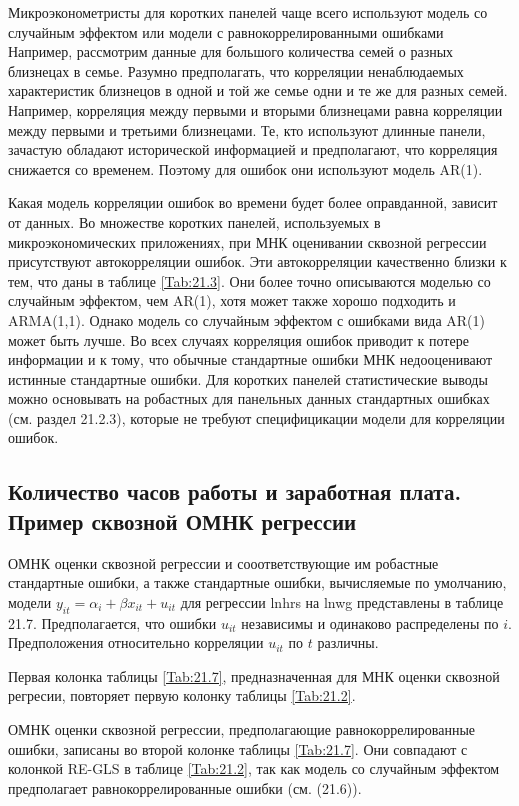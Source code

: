 Микроэконометристы для коротких панелей чаще всего используют модель со случайным эффектом или модели с равнокоррелированными ошибками Например, рассмотрим данные для большого количества семей о разных близнецах в семье. Разумно предполагать, что корреляции ненаблюдаемых характеристик близнецов в одной и той же семье одни и те же для разных семей. Например, корреляция между первыми и вторыми близнецами равна корреляции между первыми и третьими близнецами. Те, кто используют длинные панели, зачастую обладают исторической информацией и предполагают, что корреляция снижается со временем. Поэтому для ошибок они используют модель AR(1). 

Какая модель корреляции ошибок во времени будет более оправданной, зависит от данных. Во множестве коротких панелей, используемых в микроэкономических приложениях, при МНК оценивании сквозной регрессии присутствуют автокорреляции ошибок. Эти автокорреляции качественно близки к тем, что даны в таблице \ref{Tab:21.3}. Они более точно описываются моделью со случайным эффектом, чем AR(1), хотя может также хорошо подходить и ARMA(1,1). Однако модель со случайным эффектом с ошибками вида AR(1) может быть лучше. Во всех случаях корреляция ошибок приводит к потере информации и к тому, что обычные стандартные ошибки МНК недооценивают истинные стандартные ошибки. Для коротких панелей статистические выводы можно основывать на робастных для панельных данных стандартных ошибках (см. раздел 21.2.3), которые не требуют специфицикации модели для корреляции ошибок.

\subsection{Количество часов работы и заработная плата. Пример сквозной ОМНК регрессии}

ОМНК оценки сквозной регрессии и сооответствующие им робастные стандартные ошибки, а также стандартные ошибки, вычисляемые по умолчанию, модели $y_{it}=\alpha_i+\beta x_{it} + u_{it}$ для регрессии lnhrs на lnwg представлены в таблице 21.7. Предполагается, что ошибки $u_{it}$ независимы и одинаково распределены по $i$. Предположения относительно корреляции $u_{it}$ по $t$ различны.

Первая колонка таблицы \ref{Tab:21.7}, предназначенная для МНК оценки сквозной регресии, повторяет первую колонку таблицы \ref{Tab:21.2}.

ОМНК оценки сквозной регрессии, предполагающие равнокоррелированные ошибки, записаны во второй колонке таблицы \ref{Tab:21.7}. Они совпадают с колонкой RE-GLS в таблице \ref{Tab:21.2}, так как модель со случайным эффектом предполагает равнокоррелированные ошибки (см. (21.6)).

